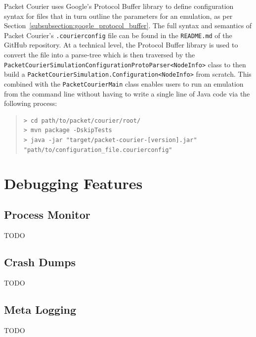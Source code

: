 Packet Courier uses Google's Protocol Buffer library\cite{google_protobuf} to define configuration syntax for files
that in turn outline the parameters for an emulation, as per Section~\ref{subsubsection:google_protocol_buffer}. The
full syntax and semantics of Packet Courier's \texttt{.courierconfig} file can be found in the \texttt{README.md} of
the GitHub repository\cite{packet_courier}. At a technical level, the Protocol Buffer library is used to convert the
file into a parse-tree which is then traversed by the
\texttt{PacketCourierSimulationConfigurationProtoParser<NodeInfo>} class to then build a
\texttt{PacketCourierSimulation.Configuration<NodeInfo>} from scratch. This combined with the
\texttt{PacketCourierMain} class enables users to run an emulation from the command line without having to write a
single line of Java code via the following process:
\begin{quote}
    \texttt{> cd path/to/packet/courier/root/} \\
    \texttt{> mvn package -DskipTests} \\
    \texttt{> java -jar "target/packet-courier-[version].jar"} \\ \texttt{"path/to/configuration\_file.courierconfig"}
\end{quote}


\section{Debugging Features}\label{section:debugging_features}

\subsection{Process Monitor}\label{subsection:process_monitor}

TODO

\subsection{Crash Dumps}\label{subsection:crash_dumps}

TODO

\subsection{Meta Logging}\label{subsection:meta_logging}

TODO
